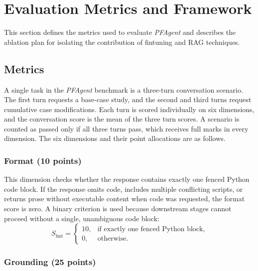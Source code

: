 \documentclass[journal]{IEEEtran}
\begin{document}

\section{Evaluation Metrics and Framework}
\label{sec:eval}

This section defines the metrics used to evaluate \emph{PFAgent} and describes the ablation plan for isolating the contribution of fintuning and RAG techniques.

\subsection{Metrics}
\label{subsec:metrics}

A single task in the \emph{PFAgent} benchmark is a three-turn conversation scenario. The first turn requests a base-case study, and the second and third turns request cumulative case modifications.
Each turn is scored individually on six dimensions, and the conversation score is the mean of the three turn scores.
A scenario is counted as passed only if all three turns pass, which receives full marks in every dimension.
The six dimensions and their point allocations are as follows.

\subsubsection{Format (10 points)}

This dimension checks whether the response contains exactly one fenced Python code block.
If the response omits code, includes multiple conflicting scripts, or returns prose without executable content when code was requested, the format score is zero.
A binary criterion is used because downstream stages cannot proceed without a single, unambiguous code block:
\begin{equation}
S_{\mathrm{fmt}} =
  \begin{cases}
    10, & \text{if exactly one fenced Python block},\\
    0,  & \text{otherwise}.
  \end{cases}
\label{eq:format}
\end{equation}

\subsubsection{Grounding (25 points)}
\end{document}
